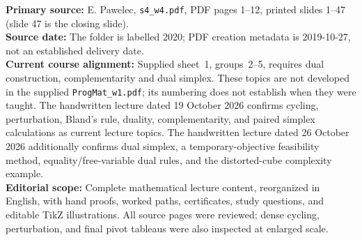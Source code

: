 \documentclass[11pt,a4paper]{article}
\begin{document}
\begingroup\small
\noindent\textbf{Primary source:} E. Pawelec, \texttt{s4\_w4.pdf},
PDF pages 1--12, printed slides 1--47 (slide 47 is the closing slide).\\
\textbf{Source date:} The folder is labelled 2020; PDF creation metadata is
2019-10-27, not an established delivery date.\\
\textbf{Current course alignment:} Supplied sheet~1, groups~2--5, requires
dual construction, complementarity and dual simplex. These topics are not
developed in the supplied \texttt{ProgMat\_w1.pdf}; its numbering does not
establish when they were taught. The handwritten lecture dated 19 October 2026 confirms cycling, perturbation,
Bland's rule, duality, complementarity, and paired simplex calculations as current
lecture topics. The handwritten lecture dated 26 October 2026 additionally
confirms dual simplex, a temporary-objective feasibility method, equality/free-variable
dual rules, and the distorted-cube complexity example.\\
\textbf{Editorial scope:} Complete mathematical lecture content, reorganized
in English, with hand proofs, worked paths, certificates, study questions, and
editable TikZ illustrations. All source pages were reviewed; dense cycling,
perturbation, and final pivot tableaus were also inspected at enlarged scale.
\end{document}
